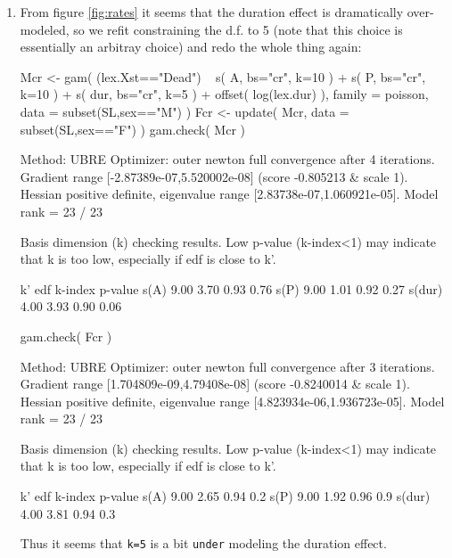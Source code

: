 \begin{enumerate}[resume]
\item From figure \ref{fig:rates} it seems that the duration effect is
dramatically over-modeled, so we refit constraining the d.f. to 5 (note
that this choice is essentially an arbitray choice) and redo the whole
thing again:
\begin{Schunk}
\begin{Sinput}
 Mcr <- gam( (lex.Xst=="Dead") ~ s(   A, bs="cr", k=10 ) +
                                 s(   P, bs="cr", k=10 ) +
                                 s( dur, bs="cr", k=5 ) +
                                 offset( log(lex.dur) ),
             family = poisson,
               data = subset(SL,sex=="M") )
 Fcr <- update( Mcr, 
               data = subset(SL,sex=="F") )
 gam.check( Mcr )
\end{Sinput}
\begin{Soutput}
Method: UBRE   Optimizer: outer newton
full convergence after 4 iterations.
Gradient range [-2.87389e-07,5.520002e-08]
(score -0.805213 & scale 1).
Hessian positive definite, eigenvalue range [2.83738e-07,1.060921e-05].
Model rank =  23 / 23 

Basis dimension (k) checking results. Low p-value (k-index<1) may
indicate that k is too low, especially if edf is close to k'.

         k'  edf k-index p-value
s(A)   9.00 3.70    0.93    0.76
s(P)   9.00 1.01    0.92    0.27
s(dur) 4.00 3.93    0.90    0.06
\end{Soutput}
\begin{Sinput}
 gam.check( Fcr )
\end{Sinput}
\begin{Soutput}
Method: UBRE   Optimizer: outer newton
full convergence after 3 iterations.
Gradient range [1.704809e-09,4.79408e-08]
(score -0.8240014 & scale 1).
Hessian positive definite, eigenvalue range [4.823934e-06,1.936723e-05].
Model rank =  23 / 23 

Basis dimension (k) checking results. Low p-value (k-index<1) may
indicate that k is too low, especially if edf is close to k'.

         k'  edf k-index p-value
s(A)   9.00 2.65    0.94     0.2
s(P)   9.00 1.92    0.96     0.9
s(dur) 4.00 3.81    0.94     0.3
\end{Soutput}
\end{Schunk}
Thus it seems that \texttt{k=5} is a bit \texttt{under} modeling the
duration effect.


\end{enumerate}
